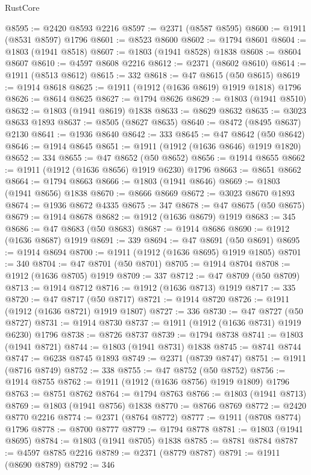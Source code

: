 \begin{lexlean}{RustCore}
\begin{coremodule}
@8595 := @2420 @8593 @2216
@8597 := @2371 (@8587 @8595)
@8600 := @1911 (@8531 @8597) @1796
@8601 := @8523 @8600
@8602 := @1794 @8601
@8604 := @1803 (@1941 @8518)
@8607 := @1803 (@1941 @8528) @1838
@8608 := @8604 @8607
@8610 := @4597 @8608 @2216
@8612 := @2371 (@8602 @8610)
@8614 := @1911 (@8513 @8612)
@8615 := 332
@8618 := @47 @8615 (@50 @8615)
@8619 := @1914 @8618
@8625 := @1911 (@1912 (@1636 @8619) @1919 @1818) @1796
@8626 := @8614 @8625
@8627 := @1794 @8626
@8629 := @1803 (@1941 @8510)
@8632 := @1803 (@1941 @8619) @1838
@8633 := @8629 @8632
@8635 := @3023 @8633 @1893
@8637 := @8505 (@8627 @8635)
@8640 := @8472 (@8495 @8637) @2130
@8641 := @1936 @8640
@8642 := 333
@8645 := @47 @8642 (@50 @8642)
@8646 := @1914 @8645
@8651 := @1911 (@1912 (@1636 @8646) @1919 @1820)
@8652 := 334
@8655 := @47 @8652 (@50 @8652)
@8656 := @1914 @8655
@8662 := @1911 (@1912 (@1636 @8656) @1919 @6230) @1796
@8663 := @8651 @8662
@8664 := @1794 @8663
@8666 := @1803 (@1941 @8646)
@8669 := @1803 (@1941 @8656) @1838
@8670 := @8666 @8669
@8672 := @3023 @8670 @1893
@8674 := @1936 @8672 @4335
@8675 := 347
@8678 := @47 @8675 (@50 @8675)
@8679 := @1914 @8678
@8682 := @1912 (@1636 @8679) @1919
@8683 := 345
@8686 := @47 @8683 (@50 @8683)
@8687 := @1914 @8686
@8690 := @1912 (@1636 @8687) @1919
@8691 := 339
@8694 := @47 @8691 (@50 @8691)
@8695 := @1914 @8694
@8700 := @1911 (@1912 (@1636 @8695) @1919 @1805)
@8701 := 340
@8704 := @47 @8701 (@50 @8701)
@8705 := @1914 @8704
@8708 := @1912 (@1636 @8705) @1919
@8709 := 337
@8712 := @47 @8709 (@50 @8709)
@8713 := @1914 @8712
@8716 := @1912 (@1636 @8713) @1919
@8717 := 335
@8720 := @47 @8717 (@50 @8717)
@8721 := @1914 @8720
@8726 := @1911 (@1912 (@1636 @8721) @1919 @1807)
@8727 := 336
@8730 := @47 @8727 (@50 @8727)
@8731 := @1914 @8730
@8737 := @1911 (@1912 (@1636 @8731) @1919 @6230) @1796
@8738 := @8726 @8737
@8739 := @1794 @8738
@8741 := @1803 (@1941 @8721)
@8744 := @1803 (@1941 @8731) @1838
@8745 := @8741 @8744
@8747 := @6238 @8745 @1893
@8749 := @2371 (@8739 @8747)
@8751 := @1911 (@8716 @8749)
@8752 := 338
@8755 := @47 @8752 (@50 @8752)
@8756 := @1914 @8755
@8762 := @1911 (@1912 (@1636 @8756) @1919 @1809) @1796
@8763 := @8751 @8762
@8764 := @1794 @8763
@8766 := @1803 (@1941 @8713)
@8769 := @1803 (@1941 @8756) @1838
@8770 := @8766 @8769
@8772 := @2420 @8770 @2216
@8774 := @2371 (@8764 @8772)
@8777 := @1911 (@8708 @8774) @1796
@8778 := @8700 @8777
@8779 := @1794 @8778
@8781 := @1803 (@1941 @8695)
@8784 := @1803 (@1941 @8705) @1838
@8785 := @8781 @8784
@8787 := @4597 @8785 @2216
@8789 := @2371 (@8779 @8787)
@8791 := @1911 (@8690 @8789)
@8792 := 346

\end{coremodule}
\end{lexlean}
